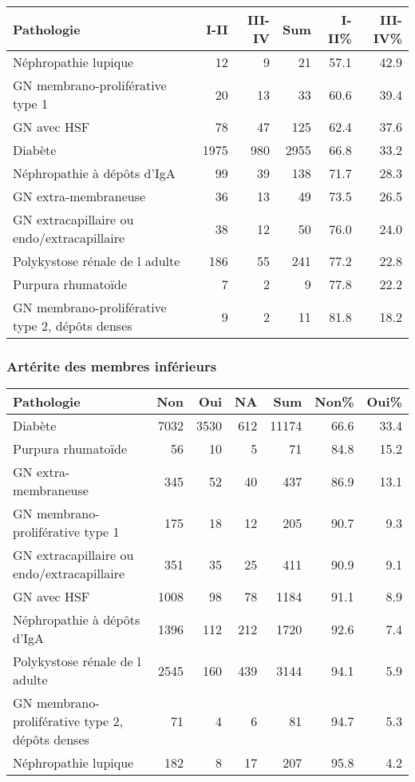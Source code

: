 \documentclass[11pt,a4paper]{article}\usepackage[]{graphicx}\usepackage[]{color}
\begin{document}
\begin{table}[H]
\centering
\begin{tabular}{lrrrrr}
  \hline
Pathologie & I-II & III-IV & Sum & I-II\% & III-IV\% \\ 
  \hline
Néphropathie lupique & 12 &  9 & 21 & 57.1 & 42.9 \\ 
  GN membrano-proliférative type 1 & 20 & 13 & 33 & 60.6 & 39.4 \\ 
  GN avec HSF & 78 & 47 & 125 & 62.4 & 37.6 \\ 
  Diabète & 1975 & 980 & 2955 & 66.8 & 33.2 \\ 
  Néphropathie à dépôts d'IgA & 99 & 39 & 138 & 71.7 & 28.3 \\ 
  GN extra-membraneuse & 36 & 13 & 49 & 73.5 & 26.5 \\ 
  GN extracapillaire ou endo/extracapillaire & 38 & 12 & 50 & 76.0 & 24.0 \\ 
  Polykystose rénale de l adulte & 186 & 55 & 241 & 77.2 & 22.8 \\ 
  Purpura rhumatoïde &  7 &  2 &  9 & 77.8 & 22.2 \\ 
  GN membrano-proliférative type 2, dépôts denses &  9 &  2 & 11 & 81.8 & 18.2 \\ 
   \hline
\end{tabular}
\end{table}



\subsubsection*{Artérite des membres inférieurs}

\begin{table}[H]
\centering
\begin{tabular}{lrrrrrr}
  \hline
Pathologie & Non & Oui & NA & Sum & Non\% & Oui\% \\ 
  \hline
Diabète & 7032 & 3530 & 612 & 11174 & 66.6 & 33.4 \\ 
  Purpura rhumatoïde & 56 & 10 &  5 & 71 & 84.8 & 15.2 \\ 
  GN extra-membraneuse & 345 & 52 & 40 & 437 & 86.9 & 13.1 \\ 
  GN membrano-proliférative type 1 & 175 & 18 & 12 & 205 & 90.7 & 9.3 \\ 
  GN extracapillaire ou endo/extracapillaire & 351 & 35 & 25 & 411 & 90.9 & 9.1 \\ 
  GN avec HSF & 1008 & 98 & 78 & 1184 & 91.1 & 8.9 \\ 
  Néphropathie à dépôts d'IgA & 1396 & 112 & 212 & 1720 & 92.6 & 7.4 \\ 
  Polykystose rénale de l adulte & 2545 & 160 & 439 & 3144 & 94.1 & 5.9 \\ 
  GN membrano-proliférative type 2, dépôts denses & 71 &  4 &  6 & 81 & 94.7 & 5.3 \\ 
  Néphropathie lupique & 182 &  8 & 17 & 207 & 95.8 & 4.2 \\ 
   \hline
\end{tabular}
\end{table}
\end{document}
